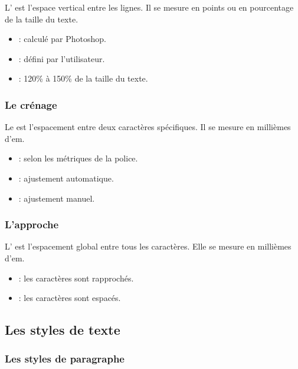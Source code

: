 L' est l'espace vertical entre les lignes. Il se mesure en points ou en pourcentage de la taille du texte.

\begin{itemize}
    \item {} : calculé par Photoshop.
    \item {} : défini par l'utilisateur.
    \item {} : 120\% à 150\% de la taille du texte.
\end{itemize}

\subsubsection{Le crénage}

Le  est l'espacement entre deux caractères spécifiques. Il se mesure en millièmes d'em.

\begin{itemize}
    \item {} : selon les métriques de la police.
    \item {} : ajustement automatique.
    \item {} : ajustement manuel.
\end{itemize}

\subsubsection{L'approche}

L' est l'espacement global entre tous les caractères. Elle se mesure en millièmes d'em.

\begin{itemize}
    \item {} : les caractères sont rapprochés.
    \item {} : les caractères sont espacés.
\end{itemize}

\subsection{Les styles de texte}

\subsubsection{Les styles de paragraphe}


